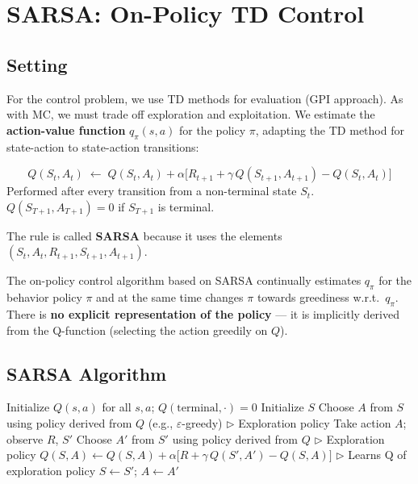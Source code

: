 \documentclass[11pt,a4paper]{article}
\theoremstyle{definition}
\theoremstyle{plain}
\theoremstyle{remark}
\begin{document}
\section{SARSA: On-Policy TD Control}

\subsection{Setting}

For the control problem, we use TD methods for evaluation (GPI approach). As with MC, we must trade off exploration and exploitation. We estimate the \textbf{action-value function} $q_\pi(s, a)$ for the policy $\pi$, adapting the TD method for state-action to state-action transitions:

\begin{tcolorbox}[colback=green!5!white, colframe=green!60!black, title={SARSA Update Rule}]
\[
    Q(S_t, A_t) \;\leftarrow\; Q(S_t, A_t) + \alpha\bigl[R_{t+1} + \gamma\, Q(S_{t+1}, A_{t+1}) - Q(S_t, A_t)\bigr]
\]
Performed after every transition from a non-terminal state $S_t$. $Q(S_{T+1}, A_{T+1}) = 0$ if $S_{T+1}$ is terminal.
\end{tcolorbox}

The rule is called \textbf{SARSA} because it uses the elements $(S_t, A_t, R_{t+1}, S_{t+1}, A_{t+1})$.

The on-policy control algorithm based on SARSA continually estimates $q_\pi$ for the behavior policy $\pi$ and at the same time changes $\pi$ towards greediness w.r.t.\ $q_\pi$. There is \textbf{no explicit representation of the policy} — it is implicitly derived from the Q-function (selecting the action greedily on $Q$).

\subsection{SARSA Algorithm}

\begin{algorithm}
\caption{SARSA (on-policy TD control), estimating $Q \approx q_*$}
\begin{algorithmic}
\STATE Initialize $Q(s, a)$ for all $s, a$; $Q(\text{terminal}, \cdot) = 0$
    \STATE Initialize $S$
    \STATE Choose $A$ from $S$ using policy derived from $Q$ (e.g., $\varepsilon$-greedy) \hfill $\triangleright$ Exploration policy
    \REPEAT
        \STATE Take action $A$; observe $R$, $S'$
        \STATE Choose $A'$ from $S'$ using policy derived from $Q$ \hfill $\triangleright$ Exploration policy
        \STATE $Q(S, A) \leftarrow Q(S, A) + \alpha\bigl[R + \gamma\, Q(S', A') - Q(S, A)\bigr]$ \hfill $\triangleright$ Learns Q of exploration policy
        \STATE $S \leftarrow S'$; $A \leftarrow A'$
\ENDFOR
\end{algorithmic}
\end{algorithm}
\end{document}
